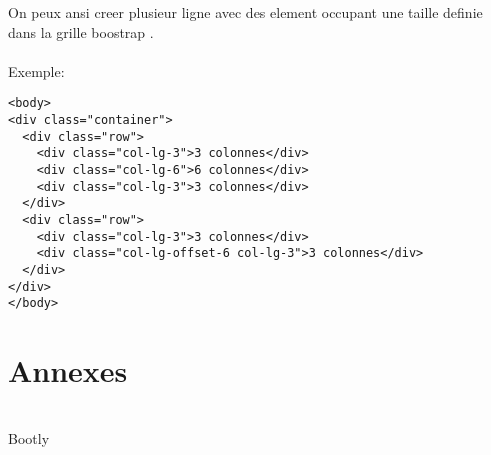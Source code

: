 \documentclass[a4paper,12pt]{book}
\begin{document}
On peux ansi creer plusieur ligne avec des element occupant une taille definie dans la grille boostrap .\\
\\
Exemple:\\
\begin{DDbox}{\linewidth}
\begin{lstlisting}
<body>
<div class="container">
  <div class="row">
    <div class="col-lg-3">3 colonnes</div>
    <div class="col-lg-6">6 colonnes</div>
    <div class="col-lg-3">3 colonnes</div>
  </div>
  <div class="row">
    <div class="col-lg-3">3 colonnes</div>
    <div class="col-lg-offset-6 col-lg-3">3 colonnes</div>
  </div>
</div>
</body>

\end{lstlisting}
\end{DDbox}{\linewidth}

\chapter{Annexes}
\\
Bootly 
\\
\end{document}
